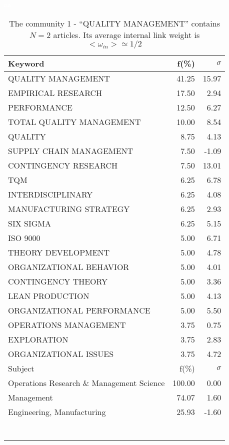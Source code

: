 \documentclass[a4paper,11pt]{report}
\begin{document}
\begin{landscape}
\begin{table}[!ht]
\caption{The community 1 - ``QUALITY MANAGEMENT'' contains $N = 2$ articles. Its average internal link weight is $<\omega_{in}> \simeq 1/2$ }
\textcolor{white}{aa}\\
{\scriptsize\begin{tabular}{|l r r|}
\hline
Keyword & f(\%) & $\sigma$\\
\hline
QUALITY MANAGEMENT & 41.25 & 15.97\\
EMPIRICAL RESEARCH & 17.50 & 2.94\\
PERFORMANCE & 12.50 & 6.27\\
TOTAL QUALITY MANAGEMENT & 10.00 & 8.54\\
QUALITY & 8.75 & 4.13\\
SUPPLY CHAIN MANAGEMENT & 7.50 & -1.09\\
CONTINGENCY RESEARCH & 7.50 & 13.01\\
TQM & 6.25 & 6.78\\
INTERDISCIPLINARY & 6.25 & 4.08\\
MANUFACTURING STRATEGY & 6.25 & 2.93\\
SIX SIGMA & 6.25 & 5.15\\
ISO 9000 & 5.00 & 6.71\\
THEORY DEVELOPMENT & 5.00 & 4.78\\
ORGANIZATIONAL BEHAVIOR & 5.00 & 4.01\\
CONTINGENCY THEORY & 5.00 & 3.36\\
LEAN PRODUCTION & 5.00 & 4.13\\
ORGANIZATIONAL PERFORMANCE & 5.00 & 5.50\\
OPERATIONS MANAGEMENT & 3.75 & 0.75\\
EXPLORATION & 3.75 & 2.83\\
ORGANIZATIONAL ISSUES & 3.75 & 4.72\\
\hline
\hline
Subject & f(\%) & $\sigma$\\
\hline
Operations Research \& Management Science & 100.00 & 0.00\\
Management & 74.07 & 1.60\\
Engineering, Manufacturing & 25.93 & -1.60\\
 &  & \\
 &  & \\
 &  & \\
 &  & \\
 &  & \\
 &  & \\
 &  & \\
\hline
\hline

\end{tabular}}
\end{table}
\end{landscape}
\end{document}
